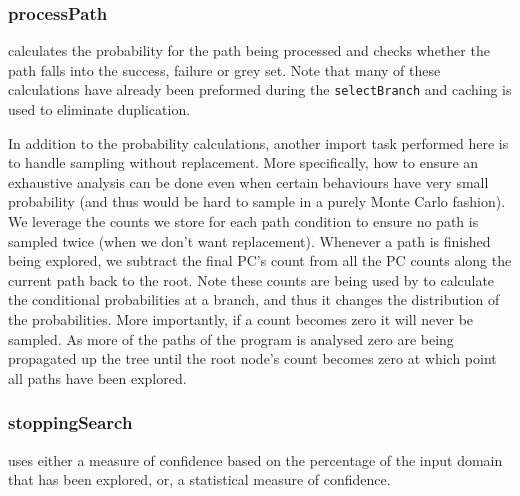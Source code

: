 
\subsubsection{processPath} calculates the probability for the path being processed and checks whether the path falls into the success, failure or grey set. Note that many of these calculations have already been preformed during the {\tt selectBranch} and caching is used to eliminate duplication. 

In addition to the probability calculations, another import task performed here is to handle sampling without replacement. More specifically, how to ensure an exhaustive analysis can be done even when certain behaviours have very small probability (and thus would be hard to sample in a purely Monte Carlo fashion). We leverage the counts we store for each path condition to ensure no path is sampled twice (when we don't want replacement). Whenever a path is finished being explored, we subtract the final PC's count from all the PC counts along the current path back to the root. Note these counts are being used by  to calculate the conditional probabilities at a branch, and thus it changes the distribution of the probabilities. More importantly, if a count becomes zero it will never be sampled. As more of the paths of the program is analysed zero are being propagated up the tree until the root node's count becomes zero at which point all paths have been explored. 

\subsubsection{stoppingSearch} uses either a measure of confidence based on the percentage of the input domain that has been explored, or, a statistical measure of confidence. 

